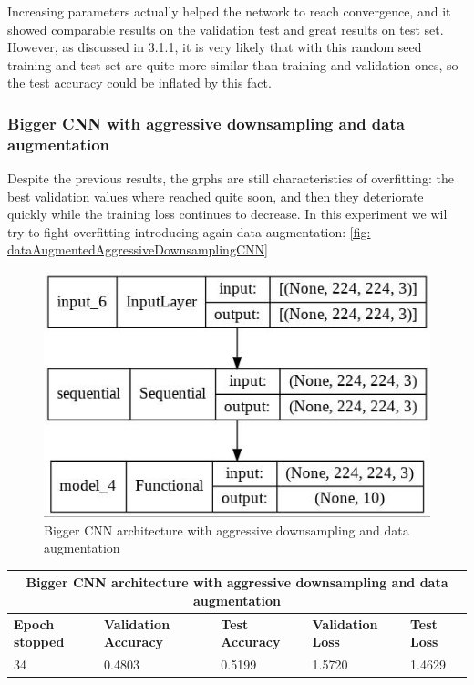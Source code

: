 \medskip

\noindent Increasing parameters actually helped the network to reach convergence, and it showed comparable results on the validation test and great results on test set. However, as discussed in 3.1.1, it is very likely that with this random seed training and test set are quite more similar than training and validation ones, so the test accuracy could be inflated by this fact.

\subsubsection{Bigger CNN with aggressive downsampling and data augmentation}
Despite the previous results, the grphs are still characteristics of overfitting: the best validation values where reached quite soon, and then they deteriorate quickly while the training loss continues to decrease. In this experiment we wil try to fight overfitting introducing again data augmentation: \ref{fig: dataAugmentedAggressiveDownsamplingCNN}

\begin{figure}[H]
	\centering
	\includegraphics[height=0.6\textwidth]{img/scratch/DataAugmentedAggressiveDownsamplingCNN.jpg}
	\caption{Bigger CNN architecture with aggressive downsampling and data augmentation}
	\label{fig: DataAugmentedAggressiveDownsamplingCNN}
\end{figure}

\medskip

\begin{tabular}{ |p{2cm}|p{2cm}|p{2cm}|p{2cm}|p{2cm}|  }
\hline
\multicolumn{5}{|c|}{Bigger CNN architecture with aggressive downsampling and data augmentation} \\
\hline
\textbf{Epoch stopped} & \textbf{Validation Accuracy} & \textbf{Test Accuracy} & \textbf{Validation Loss} & \textbf{Test Loss} \\
\hline
34 & 0.4803 & 0.5199 & 1.5720 & 1.4629\\
\hline
\end{tabular}

